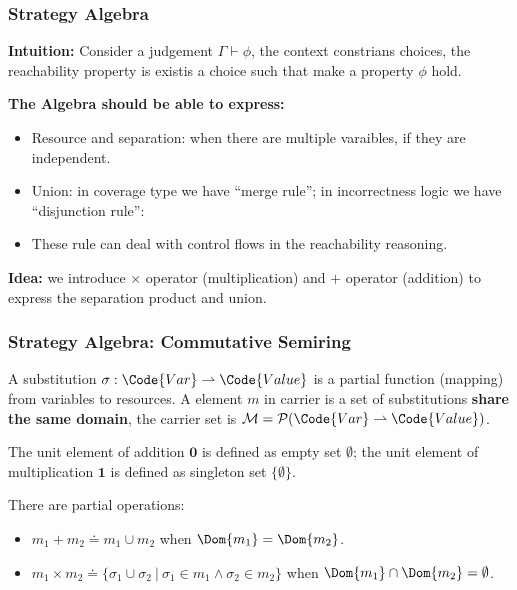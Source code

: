 \newcommand{\compable}[2]{#1 \circ #2 \downarrow}
\begin{frame}[fragile]
    \frametitle{Strategy Algebra}

\textbf{Intuition:} Consider a judgement $\Gamma \vdash \phi$, the context constrians choices, the reachability property is existis a choice such that make a property $\phi$ hold.

\textbf{The Algebra should be able to express:}
\begin{itemize}
    \item Resource and separation: when there are multiple varaibles, if they are independent.
    \item Union: in coverage type we have ``merge rule''; in incorrectness logic we have ``disjunction rule'':
    \item These rule can deal with control flows in the reachability reasoning.
\end{itemize}

\textbf{Idea:} we introduce $\times$ operator (multiplication) and $+$ operator (addition) to express the separation product and union.

\end{frame}

\begin{frame}[fragile]
    \frametitle{Strategy Algebra: Commutative Semiring}

\begin{definition}
    A substitution $\sigma: \Code{Var} \rightharpoonup \Code{Value}$ is a partial function (mapping) from variables to resources. A element $m$ in carrier is a set of substitutions \textbf{share the same domain}, the carrier set is $\mathcal{M} = \mathcal{P}(\Code{Var} \rightharpoonup \Code{Value})$.
\end{definition}

\begin{definition}
    The unit element of addition $\mathbf{0}$ is defined as empty set $\emptyset$; the unit element of multiplication $\mathbf{1}$ is defined as singleton set $\{\emptyset\}$.
\end{definition}

\begin{definition} There are partial operations:
    \begin{itemize}
        \item $m_1 + m_2 \doteq m_1 \cup m_2$ when $\Dom{m_1} = \Dom{m_2}$.
        \item $m_1 \times m_2 \doteq \{ \sigma_1 \cup \sigma_2 ~|~ \sigma_1 \in m_1 \land \sigma_2 \in m_2 \}$ when $\Dom{m_1} \cap \Dom{m_2} = \emptyset$.
    \end{itemize}
\end{definition}
        
\end{frame}

